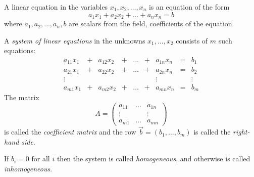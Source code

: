 \begin{definition}
    A linear equation in the variables $x_1,x_2,\dots,x_n$ is an equation of the form
    $$ a_1x_1 + a_2x_2 + \dots + a_nx_n = b$$
    where $ a_1,a_2,\dots,a_n,b$ are scalars from the field, coefficients of the equation. \par
    A \emph{system of linear equations} in the unknowns $ x_1,\dots,x_2 $ consists of $m$ such equations:
    $$ \begin{matrix}
        a_{11}x_1&+&a_{12}x_2&+&\dots&+&a_{1n}x_n&=&b_1 \\
        a_{21}x_1&+&a_{22}x_2&+&\dots&+&a_{2n}x_n&=&b_2 \\
        \vdots& &&&               &  &  \vdots&&\vdots \\
        a_{m1}x_1&+&a_{m2}x_2&+&\dots&+&a_{mn}x_n&=&b_m
    \end{matrix} $$
    The matrix
    $$ A = \begin{pmatrix}
        a_{11} &\dots &a_{1n} \\
        \vdots & & \vdots \\
        a_{m1} & \dots & a_{mn}
    \end{pmatrix} $$
    is called the \emph{coefficient matrix} and the row $ \vec{b} = (b_1,\dots,b_m) $ is called the \emph{right-hand side}. \par
    If $ b_i=0 $ for all $ i $ then the system is called \emph{homogeneous}, and otherwise is called \emph{inhomogeneous}.
\end{definition}